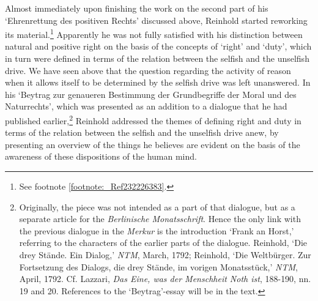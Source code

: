 Almost immediately upon finishing the work on the second part of his `Ehrenrettung des positiven Rechts' discussed above, Reinhold started reworking its material.\footnote{ See footnote \ref{footnote:_Ref232226383}. } Apparently he was not fully satisfied with his distinction between natural and positive right on the basis of the concepts of `right' and `duty', which in turn were defined in terms of the relation between the selfish and the unselfish drive. We have seen above that the question regarding the activity of reason when it allows itself to be determined by the selfish drive was left unanswered. In his `Beytrag zur genaueren Bestimmung der Grundbegriffe der Moral und des Naturrechts', which was presented as an addition to a dialogue that he had published earlier,\footnote{\label{footnote:_Ref234654472} Originally, the piece was not intended as a part of that dialogue, but as a separate article for the \textit{Berlinische Monatsschrift}. Hence the only link with the previous dialogue in the \textit{Merkur} is the introduction `Frank an Horst,' referring to the characters of the earlier parts of the dialogue. Reinhold, `Die drey St\"{a}nde. Ein Dialog,' \textit{NTM}, March, 1792; Reinhold, `Die Weltb\"{u}rger. Zur Fortsetzung des Dialogs, die drey St\"{a}nde, im vorigen Monatsst\"{u}ck,' \textit{NTM}, April, 1792. Cf. Lazzari, \textit{Das Eine, was der Menschheit Noth ist}, 188{-}190, nn. 19 and 20. References to the `Beytrag'{-}essay will be in the text. } Reinhold addressed the themes of defining right and duty in terms of the relation between the selfish and the unselfish drive anew, by presenting an overview of the things he believes are evident on the basis of the awareness of these dispositions of the human mind. 

